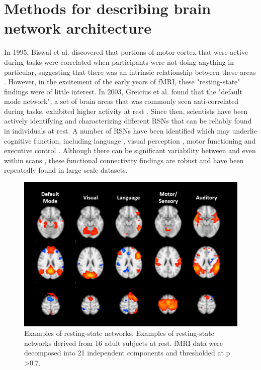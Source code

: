 \section{Methods for describing brain network architecture}

In 1995, Biswal et al. discovered that portions of motor cortex that were active during tasks were correlated when participants were not doing anything in particular, suggesting that there was an intrinsic relationship between these areas \cite{Biswal1995}. However, in the excitement of the early years of fMRI, these "resting-state" findings were of little interest. In 2003, Greicius et al. found that the "default mode network", a set of brain areas that was commonly seen anti-correlated during tasks, exhibited higher activity at rest \cite{Greicius2003}. Since then, scientists have been actively identifying and characterizing different RSNs that can be reliably found in individuals at rest. A number of RSNs have been identified which may underlie cognitive function, including language \cite{Cordes2000, Hampson2002}, visual perception \cite{Cordes2000, Simmons2012}, motor functioning \cite{Biswal1995} and executive control \cite{Seeley2007, Simmons2012}. Although there can be significant variability between and even within scans \cite{Honey2009}, these functional connectivity findings are robust and have been repeatedly found in large scale datasets.

\begin{figure}[t]
    \centering
    \includegraphics[width=12cm]{images/ch1-ica.png}
    \caption{Examples of resting-state networks. Examples of resting-state networks derived from 16 adult subjects at rest. fMRI data were decomposed into 21 independent components and thresholded at p \textgreater 0.7.} 
\end{figure}

